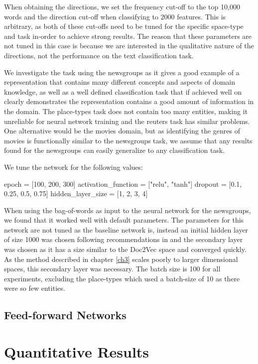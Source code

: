 When obtaining the directions, we set the frequency cut-off to the top 10,000 words and the direction cut-off when classifying to 2000 features. This is arbitrary, as both of these cut-offs need to be tuned for the specific space-type and task in-order to achieve strong results. The reason that these parameters are not tuned in this case is because we are interested in the qualitative nature of the directions, not the performance on the text classification task. 

We investigate the task using the newsgroups as it gives a good example of a representation that contains many different concepts and aspects of domain knowledge, as well as a well defined classification task that if achieved well on clearly demonstrates the representation contains a good amount of information in the domain. The place-types task does not contain too many entities, making it unreliable for neural network training and the reuters task has similar problems. One alternative would be the movies domain, but as identifying the genres of movies is functionally similar to the newsgroups task, we assume that any results found for the newsgroups can easily generalize to any classification task.

We tune the network for the following values: 

epoch = [100, 200, 300]
activation_function = ["relu", "tanh"]
dropout = [0.1, 0.25, 0.5, 0.75]
hidden_layer_size = [1,  2, 3, 4]

When using the bag-of-words as input to the neural network for the newsgroups, we found that it worked well with default parameters.  The parameters for this network are not tuned as the baseline network is, instead an initial hidden layer of size 1000 was chosen following recommendations in \cite{Nam2014a} and the secondary layer was chosen as it has a size similar to the Doc2Vec space and converged quickly. As the method described in chapter \ref{ch3} scales poorly to larger dimensional spaces, this secondary layer was necessary. The batch size is 100 for all experiments, excluding the place-types which used a batch-size of 10 as there were so few entities.

\subsection{Feed-forward Networks}


\section{Quantitative Results}

